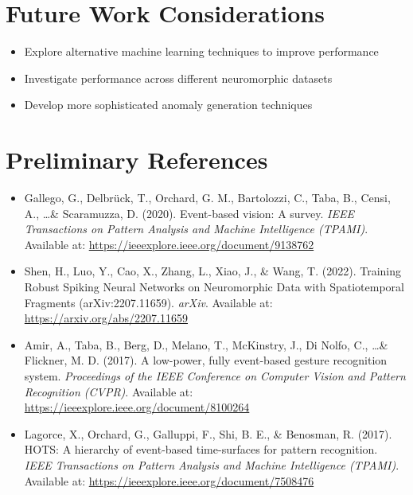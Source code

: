 \documentclass[12pt,a4paper]{article}
\begin{document}
\section{Future Work Considerations}

\begin{itemize}
    \item Explore alternative machine learning techniques to improve performance
    \item Investigate performance across different neuromorphic datasets
    \item Develop more sophisticated anomaly generation techniques
\end{itemize}

\section{Preliminary References}

\begin{itemize}
    \item Gallego, G., Delbrück, T., Orchard, G. M., Bartolozzi, C., Taba, B., Censi, A., \ldots \& Scaramuzza, D. (2020). Event-based vision: A survey. \emph{IEEE Transactions on Pattern Analysis and Machine Intelligence (TPAMI)}. Available at: \url{https://ieeexplore.ieee.org/document/9138762}

    \item Shen, H., Luo, Y., Cao, X., Zhang, L., Xiao, J., \& Wang, T. (2022). Training Robust Spiking Neural Networks on Neuromorphic Data with Spatiotemporal Fragments (arXiv:2207.11659). \emph{arXiv}. Available at: \url{https://arxiv.org/abs/2207.11659}

    \item Amir, A., Taba, B., Berg, D., Melano, T., McKinstry, J., Di Nolfo, C., \ldots \& Flickner, M. D. (2017). A low-power, fully event-based gesture recognition system. \emph{Proceedings of the IEEE Conference on Computer Vision and Pattern Recognition (CVPR)}. Available at: \url{https://ieeexplore.ieee.org/document/8100264}

    \item Lagorce, X., Orchard, G., Galluppi, F., Shi, B. E., \& Benosman, R. (2017). HOTS: A hierarchy of event-based time-surfaces for pattern recognition. \emph{IEEE Transactions on Pattern Analysis and Machine Intelligence (TPAMI)}. Available at: \url{https://ieeexplore.ieee.org/document/7508476}
\end{itemize}
\end{document}
